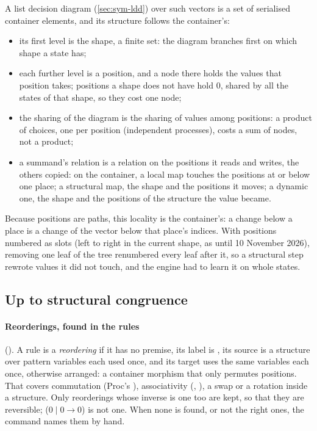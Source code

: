 A list decision diagram (\cref{sec:sym-ldd}) over such vectors is a set
of serialised container elements, and its structure follows the
container's:
\begin{itemize}
\item its first level is the shape, a finite set: the diagram branches
  first on which shape a state has;
\item each further level is a position, and a node there holds the values
  that position takes; positions a shape does not have hold $0$, shared by
  all the states of that shape, so they cost one node;
\item the sharing of the diagram is the sharing of values among
  positions: a product of choices, one per position (independent
  processes), costs a sum of nodes, not a product;
\item a summand's relation is a relation on the positions it reads and
  writes, the others copied: on the container, a local map touches the
  positions at or below one place; a structural map, the shape and the
  positions it moves; a dynamic one, the shape and the positions of the
  structure the value became.
\end{itemize}
Because positions are paths, this locality is the container's: a change
below a place is a change of the vector below that place's indices. With
positions numbered as slots (left to right in the current shape, as until
10 November 2026), removing one leaf of the tree renumbered every leaf
after it, so a structural step rewrote values it did not touch, and the
engine had to learn it on whole states.

\subsection{Up to structural congruence}\label{sec:containers:upto}

\paragraph{Reorderings, found in the rules} ().
A rule is a \emph{reordering} if it has no premise, its label is
, its source is a structure over pattern variables each used
once, and its target uses the same variables each once, otherwise
arranged: a container morphism that only permutes positions. That covers
commutation (Proc's ), associativity (,
), a swap or a rotation inside a structure. Only
reorderings whose inverse is one too are kept, so that they are
reversible;  ($0 \mid 0 \to 0$) is not one. When none is
found, or not the right ones, the command  names them by hand.

